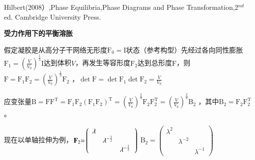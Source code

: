 \documentclass{article} %
\begin{document}
\noindent Hilbert(2008）,Phase Equilibria,Phase Diagrams and Phase Transformation,2${}^{nd}$ ed. Cambridge University Press.

\noindent \eject 

\noindent \textbf{受力作用下的平衡溶胀}

\noindent 假定凝胶是从高分子干网络无形度$\boldsymbol{\mathrm{F}}_{0} =\boldsymbol{\mathrm{I}}$状态（参考构型）先经过各向同性膨胀$\boldsymbol{\mathrm{F}}_{1} =\left(\frac{V}{V_{0} } \right)^{\frac{1}{3} } \boldsymbol{\mathrm{I}}$达到体积$V$，再发生等容形度$\boldsymbol{\mathrm{F}}_{2} $达到总形度\textbf{$\boldsymbol{\mathrm{F}}$}，则$\boldsymbol{\mathrm{F}}=\boldsymbol{\mathrm{F}}_{1} \boldsymbol{\mathrm{F}}_{2} =(\frac{V}{V_{0} } )^{\frac{1}{3} } \boldsymbol{\mathrm{F}}_{2} $ ，$\det \boldsymbol{\mathrm{F}}=\det \boldsymbol{\mathrm{F}}_{1} \det \boldsymbol{\mathrm{F}}_{2} =\frac{V}{V_{0} } $ 

\noindent 应变张量$\boldsymbol{\mathrm{B}}=\boldsymbol{\mathrm{FF}}^{\mathrm{T}} =\mathrm{F}_{1} \mathrm{F}_{2} (\mathrm{F}_{1} \mathrm{F}_{2} )^{\mathrm{T}} =(\frac{V}{V_{0} } )^{\frac{2}{3} } \mathrm{F}_{2} \mathrm{F}_{2}^{\mathrm{T}} =(\frac{V}{V_{0} } )^{\frac{2}{3} } \mathrm{B}_{2} $ ，其中$\boldsymbol{\mathrm{B}}_{2} =\boldsymbol{\mathrm{F}}_{2} \boldsymbol{\mathrm{F}}_{2}^{\mathrm{T}} $。

\noindent 现在以单轴拉伸为例，$\left. \boldsymbol{\mathrm{F}}_{2} {\rm =}\left(\begin{array}{ccc} {\lambda } & {} & {} \\ {} & {\lambda ^{-\frac{1}{2} } } & {} \\ {} & {} & {\lambda ^{-\frac{1}{2} } } \end{array}\right. \right)$ $\left. \boldsymbol{\mathrm{B}}_{2} =\left(\begin{array}{ccc} {\lambda ^{2} } & {} & {} \\ {} & {\lambda ^{-2} } & {} \\ {} & {} & {\lambda ^{-1} } \end{array}\right. \right)$ 
\end{document}
